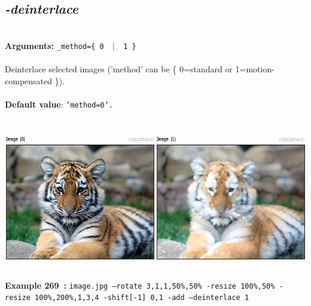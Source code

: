 \documentclass[a4paper,11pt,twoside]{book}
\begin{document}
\subsection{\emph{-deinterlace} }\vspace*{-0.5em}
~\\\textbf{Arguments: } 
{\small \texttt{\_method=\{ 0 ~$|$~ 1 \}}}\\~\\
Deinterlace selected images ('method' can be \{ 0=standard or 1=motion-compensated \}).
~\\~\\\textbf{Default value}: {\small \texttt{'method=0'.}}
\begin{center}\includegraphics[keepaspectratio=true,height=7cm,width=\textwidth]{img/gmic_def269.jpg}\\
{\footnotesize \textbf{Example 269~:} \texttt{image.jpg --rotate 3,1,1,50\%,50\% -resize 100\%,50\% -resize 100\%,200\%,1,3,4 -shift[-1] 0,1 -add --deinterlace 1}}
\end{center}
\end{document}
